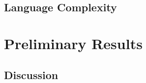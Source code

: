 \documentclass{article} %
\begin{document}

\subsection{Language Complexity}
\label{subsec:languagecomplexity}


\section{Preliminary Results}
\label{headings}


% 



\subsection{Discussion} %






\end{document}
